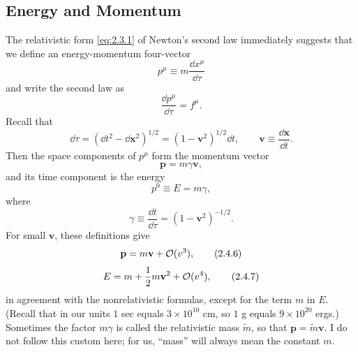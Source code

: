 
\subsection{Energy and Momentum}\label{sec:2.4}

The relativistic form \eqref{eq:2.3.1} of Newton's second law immediately
suggests that we define an energy-momentum four-vector
\begin{equation}
  p^\mu\equiv m\frac{\dd x^\mu}{\dd\tau}
  \tag{2.4.1}\label{eq:2.4.1}
\end{equation}
and write the second law as
\begin{equation}
  \frac{\dd p^\mu}{\dd\tau}=f^\mu .
  \tag{2.4.2}\label{eq:2.4.2}
\end{equation}
Recall that
\[
  \dd\tau=(\dd t^2-\dd\mathbf{x}^2)^{1/2}
  =(1-\mathbf v^2)^{1/2}\dd t ,
  \qquad
  \mathbf v\equiv\frac{\dd\mathbf{x}}{\dd t}.
\]
Then the space components of \(p^\mu\) form the momentum vector
\begin{equation}
  \mathbf p=m\gamma\mathbf v ,
  \tag{2.4.3}\label{eq:2.4.3}
\end{equation}
and its time component is the energy
\begin{equation}
  p^0\equiv E=m\gamma ,
  \tag{2.4.4}\label{eq:2.4.4}
\end{equation}
where
\begin{equation}
  \gamma\equiv\frac{\dd t}{\dd\tau}
  =(1-\mathbf v^2)^{-1/2}.
  \tag{2.4.5}\label{eq:2.4.5}
\end{equation}
For small \(\mathbf v\), these definitions give
\begin{equation}
  \mathbf p=m\mathbf v+\mathcal{O}(v^3),
  \tag{2.4.6}\label{eq:2.4.6}
\end{equation}
\begin{equation}
  E=m+\frac12m\mathbf v^2+\mathcal{O}(v^4),
  \tag{2.4.7}\label{eq:2.4.7}
\end{equation}
in agreement with the nonrelativistic formulas, except for the term \(m\) in
\(E\). (Recall that in our units \(1\) sec equals \(3\times10^{10}\) cm, so
\(1\) g equals \(9\times10^{20}\) ergs.) Sometimes the factor \(m\gamma\) is
called the relativistic mass \(\widetilde m\), so that
\(\mathbf p=\widetilde m\mathbf v\). I do not follow this custom here; for us,
``mass'' will always mean the constant \(m\).

